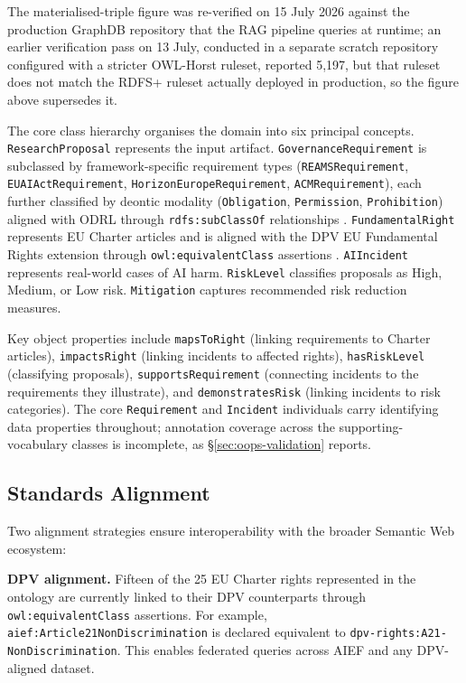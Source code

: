 The materialised-triple figure was re-verified on 15 July 2026 against the production GraphDB repository that the RAG pipeline queries at runtime; an earlier verification pass on 13 July, conducted in a separate scratch repository configured with a stricter OWL-Horst ruleset, reported 5,197, but that ruleset does not match the RDFS+ ruleset actually deployed in production, so the figure above supersedes it.

The core class hierarchy organises the domain into six principal concepts. \texttt{ResearchProposal} represents the input artifact. \texttt{GovernanceRequirement} is subclassed by framework-specific requirement types (\texttt{REAMSRequirement}, \texttt{EUAIActRequirement}, \texttt{HorizonEuropeRequirement}, \texttt{ACMRequirement}), each further classified by deontic modality (\texttt{Obligation}, \texttt{Permission}, \texttt{Prohibition}) aligned with ODRL through \texttt{rdfs:subClassOf} relationships \cite{odrl2018}. \texttt{FundamentalRight} represents EU Charter articles and is aligned with the DPV EU Fundamental Rights extension through \texttt{owl:equivalentClass} assertions \cite{dpv2024}. \texttt{AIIncident} represents real-world cases of AI harm. \texttt{RiskLevel} classifies proposals as High, Medium, or Low risk. \texttt{Mitigation} captures recommended risk reduction measures.

Key object properties include \texttt{mapsToRight} (linking requirements to Charter articles), \texttt{impactsRight} (linking incidents to affected rights), \texttt{hasRiskLevel} (classifying proposals), \texttt{supportsRequirement} (connecting incidents to the requirements they illustrate), and \texttt{demonstratesRisk} (linking incidents to risk categories). The core \texttt{Requirement} and \texttt{Incident} individuals carry identifying data properties throughout; annotation coverage across the supporting-vocabulary classes is incomplete, as \S\ref{sec:oops-validation} reports.


\subsection{Standards Alignment}

Two alignment strategies ensure interoperability with the broader Semantic Web ecosystem:

\textbf{DPV alignment.} Fifteen of the 25 EU Charter rights represented in the ontology are currently linked to their DPV counterparts through \texttt{owl:equivalentClass} assertions. For example, \texttt{aief:Article21NonDiscrimination} is declared equivalent to \texttt{dpv-rights:A21-NonDiscrimination}. This enables federated queries across AIEF and any DPV-aligned dataset.

